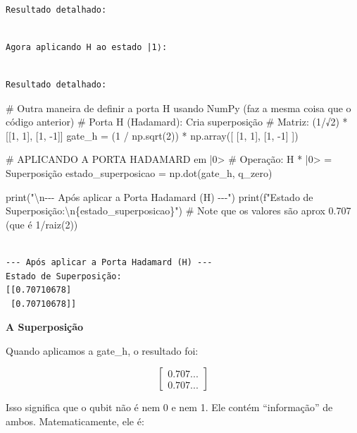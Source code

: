 \documentclass[
  brazilian,
]{report}
\newenvironment{Shaded}{\begin{snugshade}}{\end{snugshade}}
\newcommand{\NormalTok}[1]{\textcolor[rgb]{0.00,0.23,0.31}{#1}}
\begin{document}
\begin{verbatim}

Resultado detalhado:
\end{verbatim}

\begin{verbatim}

Agora aplicando H ao estado |1⟩:
\end{verbatim}

\begin{verbatim}

Resultado detalhado:
\end{verbatim}

\begin{Shaded}
\begin{Highlighting}[]

\NormalTok{\# Outra maneira de definir a porta H usando NumPy (faz a mesma coisa que o código anterior)}
\NormalTok{\# Porta H (Hadamard): Cria superposição}
\NormalTok{\# Matriz: (1/√2) * [[1, 1], [1, {-}1]]}
\NormalTok{gate\_h = (1 / np.sqrt(2)) * np.array([}
\NormalTok{    [1, 1],}
\NormalTok{    [1, {-}1]}
\NormalTok{])}

\NormalTok{\# APLICANDO A PORTA HADAMARD em |0\textgreater{}}
\NormalTok{\# Operação: H * |0\textgreater{} = Superposição}
\NormalTok{estado\_superposicao = np.dot(gate\_h, q\_zero)}

\NormalTok{print("\textbackslash{}n{-}{-}{-} Após aplicar a Porta Hadamard (H) {-}{-}{-}")}
\NormalTok{print(f"Estado de Superposição:\textbackslash{}n\{estado\_superposicao\}")}
\NormalTok{\# Note que os valores são aprox 0.707 (que é 1/raiz(2))}
\end{Highlighting}
\end{Shaded}

\begin{verbatim}

--- Após aplicar a Porta Hadamard (H) ---
Estado de Superposição:
[[0.70710678]
 [0.70710678]]
\end{verbatim}

\textbf{A Superposição}

Quando aplicamos a gate\_h, o resultado foi:

\[\begin{bmatrix} 0.707... \\ 0.707... \end{bmatrix}\]

Isso significa que o qubit não é nem 0 e nem 1. Ele contém
``informação'' de ambos. Matematicamente, ele é:
\end{document}
